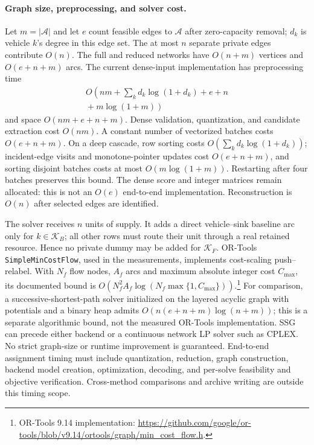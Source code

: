 \paragraph{Graph size, preprocessing, and solver cost.}
Let $m=|\mathcal A|$ and let $e$ count feasible edges to $\mathcal A$
after zero-capacity removal; $d_k$ is vehicle $k$'s degree in this
edge set. The at most $n$ separate private edges contribute $O(n)$.
The full and reduced networks have $O(n+m)$ vertices and
$O(e+n+m)$ arcs. The current dense-input implementation has
preprocessing time
\begin{equation}
\begin{split}
O\!\left(nm+\sum_k d_k\log(1+d_k)+e+n\right.\\
\left.{}+m\log(1+m)\right)
\end{split}
\label{eq:ssg_preprocessing_bound}
\end{equation}
and space $O(nm+e+n+m)$. Dense validation, quantization, and candidate
extraction cost $O(nm)$. A constant number of vectorized batches
costs $O(e+n+m)$. On a deep cascade, row sorting costs
$O(\sum_k d_k\log(1+d_k))$; incident-edge visits and monotone-pointer
updates cost $O(e+n+m)$, and sorting disjoint batches costs at most
$O(m\log(1+m))$. Restarting after four batches preserves this bound.
The dense score and integer matrices remain allocated: this is not
an $O(e)$ end-to-end implementation. Reconstruction is $O(n)$ after
selected edges are identified.

The solver receives $n$ units of supply. It adds a direct vehicle--sink
baseline arc only for $k\in\mathcal K_B$; all other rows must route
their unit through a real retained resource. Hence no private dummy
may be added for $\mathcal K_F$. OR-Tools
\texttt{SimpleMinCostFlow}, used in the measurements, implements
cost-scaling push--relabel. With $N_f$ flow nodes, $A_f$ arcs and
maximum absolute integer cost $C_{\max}$, its documented bound is
$O(N_f^2 A_f\log(N_f\max\{1,C_{\max}\}))$.\footnote{OR-Tools 9.14
implementation: \url{https://github.com/google/or-tools/blob/v9.14/ortools/graph/min_cost_flow.h}.}
For comparison, a successive-shortest-path solver initialized on the
layered acyclic graph with potentials and a binary heap admits
$O(n(e+n+m)\log(n+m))$; this is a separate algorithmic bound, not
the measured OR-Tools implementation. SSG can precede either backend
or a continuous network LP solver such as CPLEX. No strict graph-size
or runtime improvement is guaranteed. End-to-end assignment timing
must include quantization, reduction, graph construction, backend
model creation, optimization, decoding, and per-solve feasibility and
objective verification. Cross-method comparisons and archive writing
are outside this timing scope.

